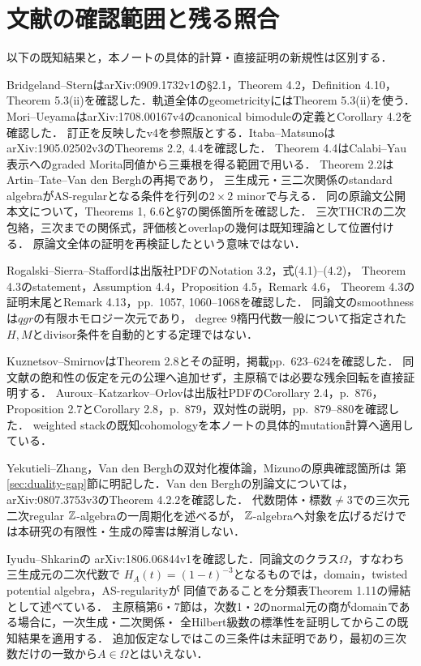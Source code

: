 \documentclass[11pt,a4paper]{ltjsarticle}
\begin{document}
\section{文献の確認範囲と残る照合}
以下の既知結果と，本ノートの具体的計算・直接証明の新規性は区別する．
\begin{description}[style=nextline]
\item[原典本文で適用箇所を確認した既知結果]
Bridgeland--Stern\cite{BS}はarXiv:0909.1732v1の\S2.1，Theorem 4.2，Definition 4.10，
Theorem 5.3(ii)を確認した．軌道全体のgeometricityにはTheorem 5.3(ii)を使う．
Mori--Ueyama\cite{MU}はarXiv:1708.00167v4のcanonical bimoduleの定義とCorollary 4.2を確認した．
訂正を反映したv4を参照版とする．Itaba--Matsuno\cite{IM}はarXiv:1905.02502v3のTheorems 2.2, 4.4を確認した．
Theorem 4.4はCalabi--Yau表示へのgraded Morita同値から三乗根を得る範囲で用いる．
Theorem 2.2はArtin--Tate--Van den Bergh\cite[Theorem 1]{ATV1990}の再掲であり，
三生成元・三二次関係のstandard algebraがAS-regularとなる条件を行列の$2\times2$ minorで与える．
同\cite{ATV1990}の原論文公開本文について，Theorems 1, 6.6と\S7の関係箇所を確認した．
三次THCRの二次包絡，三次までの関係式，評価核とoverlapの幾何は既知理論として位置付ける．
原論文全体の証明を再検証したという意味ではない．

Rogalski--Sierra--Stafford\cite{RSS}は出版社PDFのNotation 3.2，式(4.1)--(4.2)，
Theorem 4.3のstatement，Assumption 4.4，Proposition 4.5，Remark 4.6，
Theorem 4.3の証明末尾とRemark 4.13，pp.~1057, 1060--1068を確認した．
同論文のsmoothnessは$qgr$の有限ホモロジー次元であり，
degree $9$楕円代数一般について指定された$H,M$とdivisor条件を自動的とする定理ではない．

Kuznetsov--Smirnov\cite{KS}はTheorem 2.8とその証明，掲載pp.~623--624を確認した．
同文献の飽和性の仮定を元の公理へ追加せず，主原稿では必要な残余回転を直接証明する．
Auroux--Katzarkov--Orlov\cite{AKO}は出版社PDFのCorollary 2.4，p.~876，
Proposition 2.7とCorollary 2.8，p.~879，双対性の説明，pp.~879--880を確認した．
weighted stackの既知cohomologyを本ノートの具体的mutation計算へ適用している．

Yekutieli--Zhang，Van den Berghの双対化複体論，Mizunoの原典確認箇所は
第\ref{sec:duality-gap}節に明記した．Van den Bergh\cite{VdBquad}の別論文については，
arXiv:0807.3753v3のTheorem 4.2.2を確認した．
代数閉体・標数$\ne3$での三次元二次regular $\mathbb Z$-algebraの一周期化を述べるが，
$\mathbb Z$-algebraへ対象を広げるだけでは本研究の有限性・生成の障害は解消しない．

Iyudu--Shkarin\cite[\S12.1, p.~78]{IS}の
arXiv:1806.06844v1を確認した．同論文のクラス$\Omega$，すなわち三生成元の二次代数で
$H_A(t)=(1-t)^{-3}$となるものでは，domain，twisted potential algebra，AS-regularityが
同値であることを分類表Theorem 1.11の帰結として述べている．
主原稿第6・7節は，次数1・2のnormal元の商がdomainである場合に，一次生成・二次関係・
全Hilbert級数の標準性を証明してからこの既知結果を適用する．
追加仮定なしではこの三条件は未証明であり，最初の三次数だけの一致から$A\in\Omega$とはいえない．



\end{description}
\end{document}
